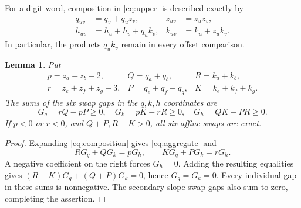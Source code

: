 \documentclass[11pt,a4paper]{article}
\newtheorem{lemma}[theorem]{Lemma}
\begin{document}
For a digit word, composition in \eqref{eq:upper} is described exactly by
\begin{equation}\label{eq:composition}
\begin{aligned}
q_{uv}&=q_v+q_uz_v,& z_{uv}&=z_uz_v,\\
h_{uv}&=h_u+h_v+q_uk_v,& k_{uv}&=k_u+z_uk_v.
\end{aligned}
\end{equation}
In particular, the products $q_uk_v$ remain in every offset comparison.

\begin{lemma}\label{lem:aggregate}
Put
\[
\begin{array}{lll}
p=z_a+z_b-2,& Q=q_a+q_b,& R=k_a+k_b,\\
r=z_e+z_f+z_g-3,& P=q_e+q_f+q_g,& K=k_e+k_f+k_g.
\end{array}
\]
The sums of the six swap gaps in the $q,k,h$ coordinates are
\begin{equation}\label{eq:aggregate}
G_q=rQ-pP\ge0,\quad G_k=pK-rR\ge0,\quad G_h=QK-PR\ge0.
\end{equation}
If $p<0$ or $r<0$, and $Q+P,R+K>0$, all six affine swaps are exact.
\end{lemma}
\begin{proof}
Expanding \eqref{eq:composition} gives \eqref{eq:aggregate} and
\[
RG_q+QG_k=pG_h,\qquad KG_q+PG_k=rG_h.
\]
A negative coefficient on the right forces $G_h=0$. Adding the resulting
equalities gives $(R+K)G_q+(Q+P)G_k=0$, hence $G_q=G_k=0$.
Every individual gap in these sums is nonnegative. The secondary-slope
swap gaps also sum to zero, completing the assertion.
\end{proof}
\end{document}
